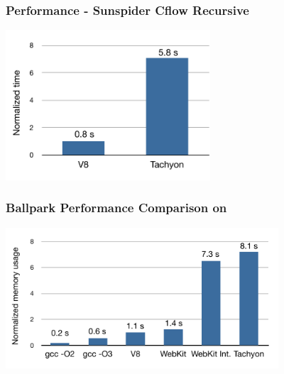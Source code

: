 \begin{frame}
\frametitle{\bf Performance - Sunspider Cflow Recursive}

\begin{center}
\includegraphics[width=3in]{images/perf-sunspider}
\end{center}


\end{frame}

\begin{frame}
\frametitle{\bf Ballpark Performance Comparison on }

\begin{center}
\includegraphics[width=4in]{images/perf-fib38}
\end{center}

\end{frame}

